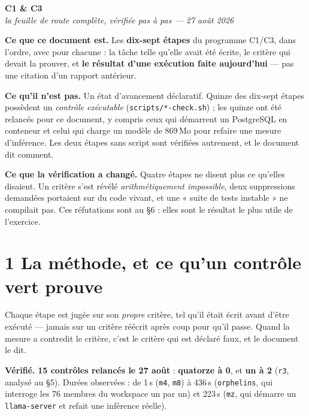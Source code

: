 \documentclass[11pt]{article}
\newcommand{\code}[1]{\texttt{\small #1}}
\newcommand{\best}[1]{{\color{efesolve}\textbf{#1}}}
\newcommand{\moyen}[1]{{\color{efeamber}\textbf{#1}}}
\newcommand{\mesure}[1]{{\color{efeteal}\textbf{Vérifié.} }#1\par}
\begin{document}
\begin{center}
{\Huge\bfseries\color{efenavy} C1 \& C3}\\[3pt]
{\large\color{efegray}\itshape la feuille de route complète, vérifiée pas à pas --- 27 août 2026}
\end{center}
\vspace{6pt}

\begin{these}
\textbf{Ce que ce document est.} Les \textbf{dix-sept étapes} du programme C1/C3, dans l'ordre, avec
pour chacune : la tâche telle qu'elle avait été écrite, le critère qui devait la prouver, et
\textbf{le résultat d'une exécution faite aujourd'hui} --- pas une citation d'un rapport antérieur.

\textbf{Ce qu'il n'est pas.} Un état d'avancement déclaratif. Quinze des dix-sept étapes possèdent un
\emph{contrôle exécutable} (\code{scripts/*-check.sh}) ; les quinze ont été relancés pour ce
document, y compris ceux qui démarrent un PostgreSQL en conteneur et celui qui charge un modèle de
869\,Mo pour refaire une mesure d'inférence. Les deux étapes sans script sont vérifiées autrement, et
le document dit comment.

\textbf{Ce que la vérification a changé.} Quatre étapes ne disent plus ce qu'elles disaient. Un
critère s'est révélé \emph{arithmétiquement impossible}, deux suppressions demandées portaient sur du
code vivant, et une « suite de tests instable » ne compilait pas. Ces réfutations sont au \S6 :
elles sont le résultat le plus utile de l'exercice.
\end{these}

\section{1 \;\textbar\; La méthode, et ce qu'un contrôle vert prouve}

Chaque étape est jugée sur son \emph{propre} critère, tel qu'il était écrit avant d'être exécuté ---
jamais sur un critère réécrit après coup pour qu'il passe. Quand la mesure a contredit le critère,
c'est le critère qui est déclaré faux, et le document le dit.

\mesure{\textbf{15 contrôles relancés le 27 août} : \best{quatorze à 0}, et \moyen{un à 2}
(\code{r3}, analysé au \S5). Durées observées : de 1\,s
(\code{m4}, \code{m8}) à 436\,s (\code{orphelins}, qui interroge les 76 membres du workspace un par
un) et 223\,s (\code{mz}, qui démarre un \code{llama-server} et refait une inférence réelle).}
\end{document}
